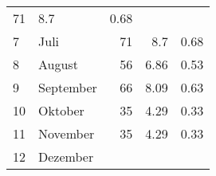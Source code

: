 \begin{longtable}{lXrrr}
       \num{71} &
       \num[round-mode=places,round-precision=2]{8.7} &
         \num[round-mode=places,round-precision=2]{0.68} \\

     7 &
     \multicolumn{1}{X}{ Juli   } &


       \num{71} &
       \num[round-mode=places,round-precision=2]{8.7} &
         \num[round-mode=places,round-precision=2]{0.68} \\

     8 &
     \multicolumn{1}{X}{ August   } &


       \num{56} &
       \num[round-mode=places,round-precision=2]{6.86} &
         \num[round-mode=places,round-precision=2]{0.53} \\

     9 &
     \multicolumn{1}{X}{ September   } &


       \num{66} &
       \num[round-mode=places,round-precision=2]{8.09} &
         \num[round-mode=places,round-precision=2]{0.63} \\

     10 &
     \multicolumn{1}{X}{ Oktober   } &


       \num{35} &
       \num[round-mode=places,round-precision=2]{4.29} &
         \num[round-mode=places,round-precision=2]{0.33} \\

     11 &
     \multicolumn{1}{X}{ November   } &


       \num{35} &
       \num[round-mode=places,round-precision=2]{4.29} &
         \num[round-mode=places,round-precision=2]{0.33} \\

     12 &
     \multicolumn{1}{X}{ Dezember   } &



\end{longtable}

